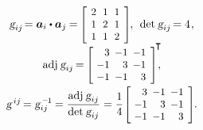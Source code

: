 \begin{otherlanguage}{russian}
\begin{tcolorbox}
\[\begin{array}{c}
\textsl{g}_{ij} \hspace{-0.32ex} = \bm{a}_i \dotp \bm{a}_j \hspace{-0.12ex} = \hspace{-0.16ex}
\scalebox{0.92}[0.92]{$\left[\hspace{-0.16ex}\begin{array}{c@{\hspace{.64em}}c@{\hspace{.64em}}c}
2 & 1 & 1 \\
1 & 2 & 1 \\
1 & 1 & 2
\end{array}\hspace{-0.12ex}\right]$} \hspace{-0.2ex}, \:\:
\operatorname{det} \hspace{.12ex} \textsl{g}_{ij} \hspace{-0.25ex} = 4 \hspace{.16ex}, \\
%
\operatorname{adj} \hspace{.12ex} \textsl{g}_{ij} \hspace{-0.25ex} = \hspace{-0.16ex}
\scalebox{0.92}[0.92]{$\left[\hspace{-0.4ex}\begin{array}{r@{\hspace{.5em}}r@{\hspace{.5em}}r}
3 & -1 & -1 \\
-1 & 3 & -1 \\
-1 & -1 & 3
\end{array}\hspace{-0.12ex}\right]^{\hspace{-0.4ex}\scalebox{1.02}{$\T$}}$} \hspace{-0.8ex}, \\
%
\textsl{g}^{\hspace{.32ex}ij} \hspace{-0.25ex} = \textsl{g}_{ij}^{\hspace{.4ex}\expminusone} \hspace{-0.12ex} = \displaystyle \frac{\operatorname{adj} \hspace{.12ex} \textsl{g}_{ij}}{\operatorname{det} \hspace{.12ex} \textsl{g}_{ij}} =
\displaystyle \frac{1}{4} \hspace{.12ex}
\scalebox{0.92}[0.92]{$\left[\hspace{-0.4ex}\begin{array}{r@{\hspace{.5em}}r@{\hspace{.5em}}r}
3 & -1 & -1 \\
-1 & 3 & -1 \\
-1 & -1 & 3
\end{array}\hspace{-0.12ex}\right]^{\mathstrut}$} \hspace{-0.25ex}.
\end{array}\]


\end{tcolorbox}
\end{otherlanguage}

